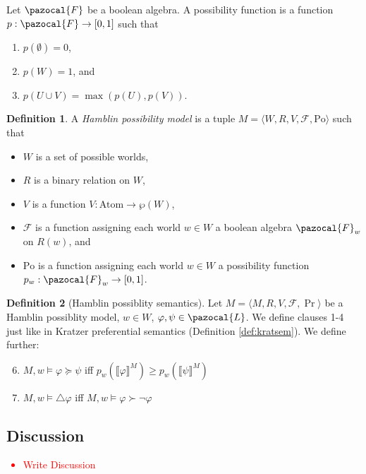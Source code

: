 \documentclass{article}
\theoremstyle{definition}
\newtheorem{definition}{Definition}
\newcommand\todo[1]{\textcolor{red}{#1}}
\renewcommand{\L}{\pazocal{L}}
\newcommand{\F}{\pazocal{F}}
\newcommand{\lb}{\llbracket}
\newcommand{\rb}{\rrbracket}
\newcommand{\Po}{\text{Po}}
\begin{document}
\noindent Let $\F$ be a boolean algebra. A possibility function is a function $p: \F \rightarrow [0,1]$ such that
\begin{enumerate}[nosep]
  \item $p(\emptyset) = 0$,
  \item $p(W) = 1$, and
  \item $p(U \cup V) = \max(p(U),p(V))$.
\end{enumerate}
\begin{definition}
    A \emph{Hamblin possibility model} is a tuple $M = \langle W,R,V,\mathcal{F},\Po\rangle$ such that
    \begin{itemize}[nosep]
        \renewcommand\labelitemi{--}
      \item $W$ is a set of possible worlds,
      \item $R$ is a binary relation on $W$,
        \item $V$ is a function $V: \text{Atom} \rightarrow \wp(W)$,
        \item $\mathcal{F}$ is a function assigning each world $w \in W$ a boolean algebra $\F_w$ on $R(w)$, and 
          \item $\Po$ is a function assigning each world $w \in W$ a possibility function \\ $p_w: \F_w \rightarrow [0,1]$.
    \end{itemize}
\end{definition}

\begin{definition}[Hamblin possiblity semantics]
    \label{def:hambsem}
    Let $M = \langle M,R,V,\mathcal{F},\Pr \rangle$ be a Hamblin possiblity model, $w \in W$, $\varphi, \psi \in \L$. We define clauses 1-4 just like in Kratzer preferential semantics (Definition \ref{def:kratsem}). We define further:
    \begin{enumerate}[nosep]
  \setcounter{enumi}{5}
      \item $M,w \models \varphi \succeq \psi$ iff $p_w(\lb \varphi \rb^M) \geq p_w(\lb \psi \rb^M) $
      \item $M,w \models \triangle \varphi$ iff $M,w \models \varphi \succ \neg \varphi$ 
    \end{enumerate}
\end{definition}
\subsection{Discussion}
\todo{
  \begin{itemize}
    \item Write Discussion
  \end{itemize}
}
\end{document}
